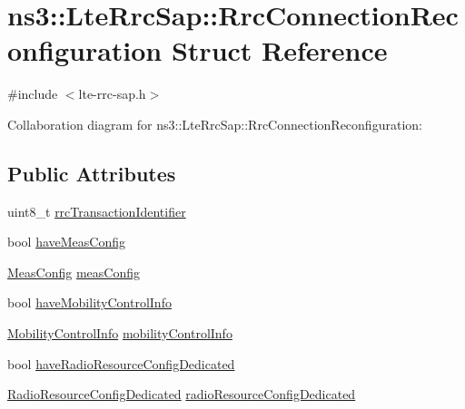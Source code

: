 \hypertarget{structns3_1_1LteRrcSap_1_1RrcConnectionReconfiguration}{}\section{ns3\+:\+:Lte\+Rrc\+Sap\+:\+:Rrc\+Connection\+Reconfiguration Struct Reference}
\label{structns3_1_1LteRrcSap_1_1RrcConnectionReconfiguration}


{\ttfamily \#include $<$lte-\/rrc-\/sap.\+h$>$}



Collaboration diagram for ns3\+:\+:Lte\+Rrc\+Sap\+:\+:Rrc\+Connection\+Reconfiguration\+:
\subsection*{Public Attributes}
\begin{DoxyCompactItemize}
\item 
uint8\+\_\+t \hyperlink{structns3_1_1LteRrcSap_1_1RrcConnectionReconfiguration_a0d45b1c58498cbc262752e45db1d3ac5}{rrc\+Transaction\+Identifier}
\item 
bool \hyperlink{structns3_1_1LteRrcSap_1_1RrcConnectionReconfiguration_ab52d41a8a579a4e90f40280bb35f30a8}{have\+Meas\+Config}
\item 
\hyperlink{structns3_1_1LteRrcSap_1_1MeasConfig}{Meas\+Config} \hyperlink{structns3_1_1LteRrcSap_1_1RrcConnectionReconfiguration_aa615ff79c08182240066ce92044f87ce}{meas\+Config}
\item 
bool \hyperlink{structns3_1_1LteRrcSap_1_1RrcConnectionReconfiguration_a0e54ede0e5b39d6c80f428fa950e3492}{have\+Mobility\+Control\+Info}
\item 
\hyperlink{structns3_1_1LteRrcSap_1_1MobilityControlInfo}{Mobility\+Control\+Info} \hyperlink{structns3_1_1LteRrcSap_1_1RrcConnectionReconfiguration_ac485e1a718f5d88faa2c47fcfdf4e7ba}{mobility\+Control\+Info}
\item 
bool \hyperlink{structns3_1_1LteRrcSap_1_1RrcConnectionReconfiguration_a68b4efa6d8c5e2c3fa4073e02f7833eb}{have\+Radio\+Resource\+Config\+Dedicated}
\item 
\hyperlink{structns3_1_1LteRrcSap_1_1RadioResourceConfigDedicated}{Radio\+Resource\+Config\+Dedicated} \hyperlink{structns3_1_1LteRrcSap_1_1RrcConnectionReconfiguration_a803894f5c17e218bdc8e81957ce5a536}{radio\+Resource\+Config\+Dedicated}
\end{DoxyCompactItemize}


